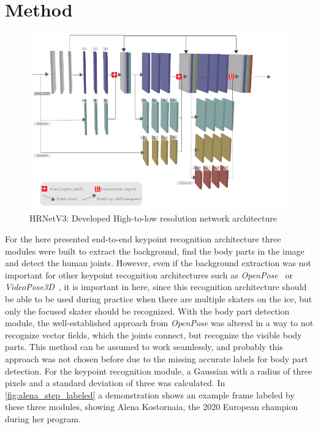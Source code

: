 

\chapter{Method} %

\label{method} %


\vspace*{\fill}
\begin{figure}[th]
    \centering
    \includegraphics[width=150mm]{Figures/custom_hrnet_lines.png}
    \decoRule
    \caption[HRNetV3: HRNet Architecture]{HRNetV3: Developed High-to-low resolution network architecture}
    \label{fig:custom_hrnet}
\end{figure}
For the here presented end-to-end keypoint recognition architecture three modules were built to extract the background,
find the body parts in the image and detect the human joints.
However, even if the background extraction was not important for other keypoint recognition architectures such as
\textit{OpenPose}~\cite{openpose} or \textit{VideoPose3D}~\cite{videopose3d}, it is important in here, since
this recognition architecture should be able to be used during practice when there are multiple skaters on the ice,
but only the focused skater should be recognized.
With the body part detection module, the well-established approach from \textit{OpenPose} was altered
in a way to not recognize vector
fields, which the joints connect, but recognize the visible body parts.
This method can be assumed to work seamlessly, and probably this approach was not chosen before due to the missing
accurate labels for body part detection.
For the keypoint recognition module, a Gaussian with a radius of three pixels and a standard deviation of
three was calculated.
In \autoref{fig:alena_step_labeled} a demonstration shows an example frame labeled by these three modules,
showing Alena Kostornaia, the 2020 European champion during her program.


